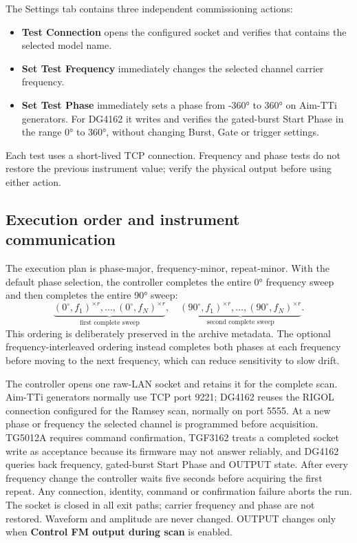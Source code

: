 \documentclass[11pt,oneside,openany]{book}
\newcommand{\code}[1]{\texttt{\detokenize{#1}}}
\newcommand{\ui}[1]{\textbf{#1}}
\begin{document}
The Settings tab contains three independent commissioning actions:
\begin{itemize}
  \item \ui{Test Connection} opens the configured socket and verifies that \code{*IDN?}
  contains the selected model name.
  \item \ui{Set Test Frequency} immediately changes the selected channel carrier frequency.
  \item \ui{Set Test Phase} immediately sets a phase from \ang{-360} to \ang{360} on
  Aim-TTi generators. For DG4162 it writes and verifies the gated-burst Start Phase in
  the range \ang{0} to \ang{360}, without changing Burst, Gate or trigger settings.
\end{itemize}
Each test uses a short-lived TCP connection. Frequency and phase tests do not restore the
previous instrument value; verify the physical output before using either action.

\subsection{Execution order and instrument communication}
The execution plan is phase-major, frequency-minor, repeat-minor. With the default phase
selection, the controller completes the entire \ang{0} frequency sweep and then completes
the entire \ang{90} sweep:
\begin{equation}
  \underbrace{(0^\circ,f_1)^{\times r},\ldots,(0^\circ,f_N)^{\times r}}_{
    \text{first complete sweep}},\quad
  \underbrace{(90^\circ,f_1)^{\times r},\ldots,(90^\circ,f_N)^{\times r}}_{
    \text{second complete sweep}}.
\end{equation}
This ordering is deliberately preserved in the archive metadata. The optional
frequency-interleaved ordering instead completes both phases at each frequency before
moving to the next frequency, which can reduce sensitivity to slow drift.

The controller opens one raw-LAN socket and retains it for the complete scan. Aim-TTi
generators normally use TCP port 9221; DG4162 reuses the RIGOL connection configured for
the Ramsey scan, normally on port 5555. At a new phase or frequency the selected channel
is programmed before acquisition. TG5012A requires command confirmation, TGF3162 treats a
completed socket write as acceptance because its firmware may not answer \code{*OPC?}
reliably, and DG4162 queries back frequency, gated-burst Start Phase and OUTPUT state.
After every frequency change the controller waits five seconds before acquiring the first
repeat. Any connection, identity, command or confirmation failure aborts the run. The
socket is closed in all exit paths; carrier frequency and phase are not restored. Waveform
and amplitude are never changed. OUTPUT changes only when \ui{Control FM output during
scan} is enabled.
\end{document}
